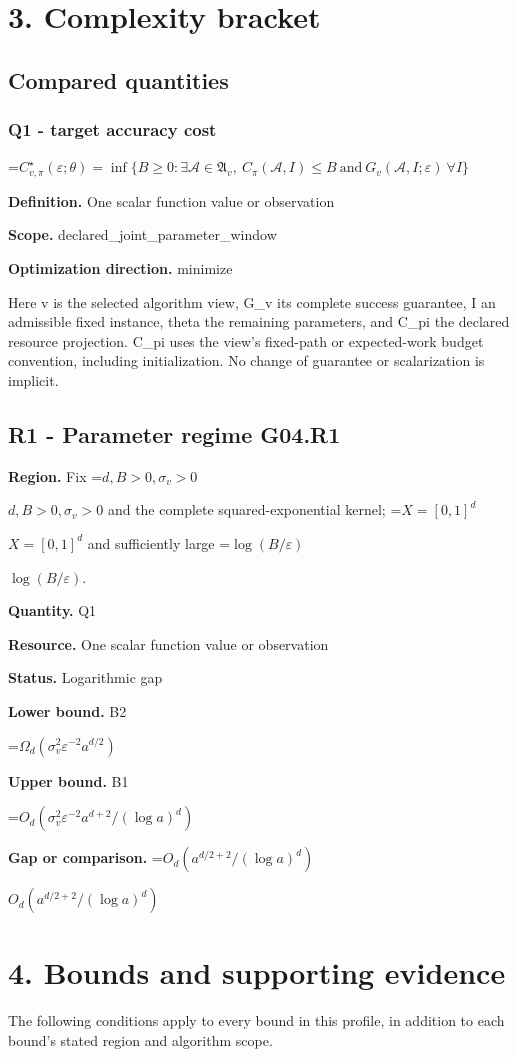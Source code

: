 \documentclass[10pt,a4paper]{article}
\newcommand{\AtlasMath}[1]{\par\begingroup\centering\setbox0=\hbox{$\displaystyle #1$}\ifdim\wd0>1.4\linewidth\typeout{ATLAS WIDE FORMULA: \the\wd0}\fi\ifdim\wd0>\linewidth\resizebox{\linewidth}{!}{\box0}\else\box0\fi\par\endgroup}
\newcommand{\AtlasInlineMath}[1]{\begingroup\setbox0=\hbox{$#1$}\ifdim\wd0>.4\linewidth\endgroup\AtlasMath{#1}\else\endgroup$#1$\fi}
\begin{document}
\section{3. Complexity bracket}
\subsection{Compared quantities}
\subsubsection{Q1 - target accuracy cost}
\AtlasMath{C^\star_{v,\pi}(\varepsilon;\theta)=\inf\{B\ge0:\exists\mathcal A\in\mathfrak A_v,\ C_\pi(\mathcal A,I)\le B\ \text{and}\ G_v(\mathcal A,I;\varepsilon)\ \forall I\}}
\textbf{Definition.} One scalar function value or observation

\textbf{Scope.} declared\_joint\_parameter\_window

\textbf{Optimization direction.} minimize

Here v is the selected algorithm view, G\_v its complete success guarantee, I an admissible fixed instance, theta the remaining parameters, and C\_pi the declared resource projection. C\_pi uses the view's fixed-path or expected-work budget convention, including initialization. No change of guarantee or scalarization is implicit.

\subsection{R1 - Parameter regime G04.R1}
\textbf{Region.} Fix \AtlasInlineMath{d,B>0,\sigma_v>0} and the complete squared-exponential kernel; \AtlasInlineMath{X=[0,1]^d} and sufficiently large \AtlasInlineMath{\log(B/\varepsilon)}.

\textbf{Quantity.} Q1

\textbf{Resource.} One scalar function value or observation

\textbf{Status.} Logarithmic gap

\textbf{Lower bound.} B2

\AtlasMath{\Omega_d(\sigma_v^2\varepsilon^{-2}a^{d/2})}
\textbf{Upper bound.} B1

\AtlasMath{O_d(\sigma_v^2\varepsilon^{-2}a^{d+2}/(\log a)^d)}
\textbf{Gap or comparison.} \AtlasInlineMath{O_d(a^{d/2+2}/(\log a)^d)}

\section{4. Bounds and supporting evidence}
The following conditions apply to every bound in this profile, in addition to each bound's stated region and algorithm scope.
\end{document}
